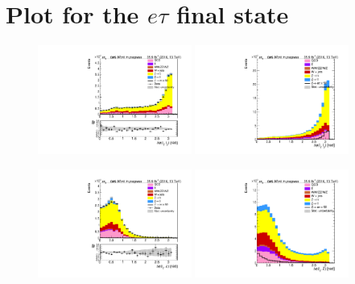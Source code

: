 \newpage

\section*{Plot for the $e\tau$ final state}

\begin{figure}[htp]
	\includegraphics[width=0.45\textwidth]{plots/et/DeltaPhiL1L2_CR.pdf}
	\includegraphics[width=0.45\textwidth]{plots/et/DeltaPhiL1L2_withsignal.pdf}

	\includegraphics[width=0.45\textwidth]{plots/et/DeltaPhiL1Z_CR.pdf}
	\includegraphics[width=0.45\textwidth]{plots/et/DeltaPhiL1Z_withsignal.pdf}

\end{figure}


